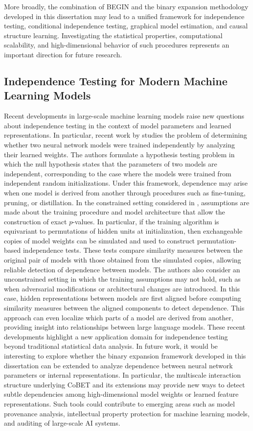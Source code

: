 \documentclass[12pt,reqno,oneside]{amsbook}
\theoremstyle{definition}
\theoremstyle{remark}
\begin{document}
More broadly, the combination of BEGIN and the binary expansion methodology
developed in this dissertation may lead to a unified framework for
independence testing, conditional independence testing, graphical model
estimation, and causal structure learning. Investigating the statistical
properties, computational scalability, and high-dimensional behavior of such
procedures represents an important direction for future research.


\subsection{Independence Testing for Modern Machine Learning Models} Recent developments in large-scale machine learning models raise new questions about independence testing in the context of model parameters and learned representations. In particular, recent work by \citet{zhu2025independence} studies the problem of determining whether two neural network models were trained independently by analyzing their learned weights. The authors formulate a hypothesis testing problem in which the null hypothesis states that the parameters of two models are independent, corresponding to the case where the models were trained from independent random initializations. Under this framework, dependence may arise when one model is derived from another through procedures such as fine-tuning, pruning, or distillation. In the constrained setting considered in \citet{zhu2025independence}, assumptions are made about the training procedure and model architecture that allow the construction of exact $p$-values. In particular, if the training algorithm is equivariant to permutations of hidden units at initialization, then exchangeable copies of model weights can be simulated and used to construct permutation-based independence tests. These tests compare similarity measures between the original pair of models with those obtained from the simulated copies, allowing reliable detection of dependence between models. The authors also consider an unconstrained setting in which the training assumptions may not hold, such as when adversarial modifications or architectural changes are introduced. In this case, hidden representations between models are first aligned before computing similarity measures between the aligned components to detect dependence. This approach can even localize which parts of a model are derived from another, providing insight into relationships between large language models. These recent developments highlight a new application domain for independence testing beyond traditional statistical data analysis. In future work, it would be interesting to explore whether the binary expansion framework developed in this dissertation can be extended to analyze dependence between neural network parameters or internal representations. In particular, the multiscale interaction structure underlying CoBET and its extensions may provide new ways to detect subtle dependencies among high-dimensional model weights or learned feature representations. Such tools could contribute to emerging areas such as model provenance analysis, intellectual property protection for machine learning models, and auditing of large-scale AI systems.
\end{document}
